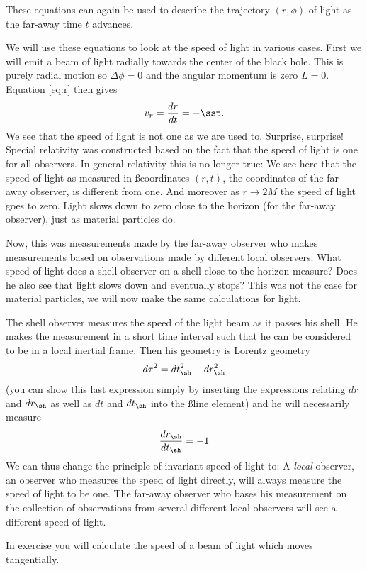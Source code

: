 {\begin{multicols}{2}
These equations can again be used to describe the trajectory $(r,\phi)$ of light as the far-away time $t$ advances. 

We will use these equations to look at the speed of light in various cases. First we will emit a beam of light radially towards the center of the black hole. This is purely radial motion so $\Delta\phi=0$ and the angular momentum is zero $L=0$. Equation \ref{eq:r} then gives
\begin{equation}
\label{eq:vr}
v_r=\frac{dr}{dt}=-\sst.
\end{equation}
We see that the speed of light is not one as we are used to. Surprise, surprise! Special relativity was constructed based on the fact that the speed of light is one for all observers. In general relativity this is no longer true: We see here that the speed of light as measured in \ss coordinates $(r,t)$, the coordinates of the far-away observer, is different from one. And moreover as $r\rightarrow2M$ the speed of light goes to zero. Light slows down to zero close to the horizon (for the far-away observer), just as material particles do.

Now, this was measurements made by the far-away observer who makes measurements based on observations made by different local observers. What speed of light does a shell observer on a shell close to the horizon measure? Does he also see that light slows down and eventually stops? This was not the case for material particles, we will now make the same calculations for light.

The shell observer measures the speed of the light beam as it passes his shell. He makes the measurement in a short time interval such that he can be considered to be in a local inertial frame. Then his geometry is Lorentz geometry
\[
d\tau^2=dt_\sh^2-dr_\sh^2
\]
(you can show this last expression simply by inserting the expressions relating $dr$ and $dr_\sh$ as well as $dt$ and $dt_\sh$ into the \ss line element) and he will necessarily measure
\[
\frac{dr_\sh}{dt_\sh}=-1
\]
We can thus change the principle of invariant speed of light to: A \emph{local} observer, an observer who measures the speed of light directly, will always measure the speed of light to be one. The far-away observer who bases his measurement on the collection of observations from several different local observers will see a different speed of light.

In exercise  you will calculate the speed of a beam of light which moves tangentially.


\end{multicols}}
